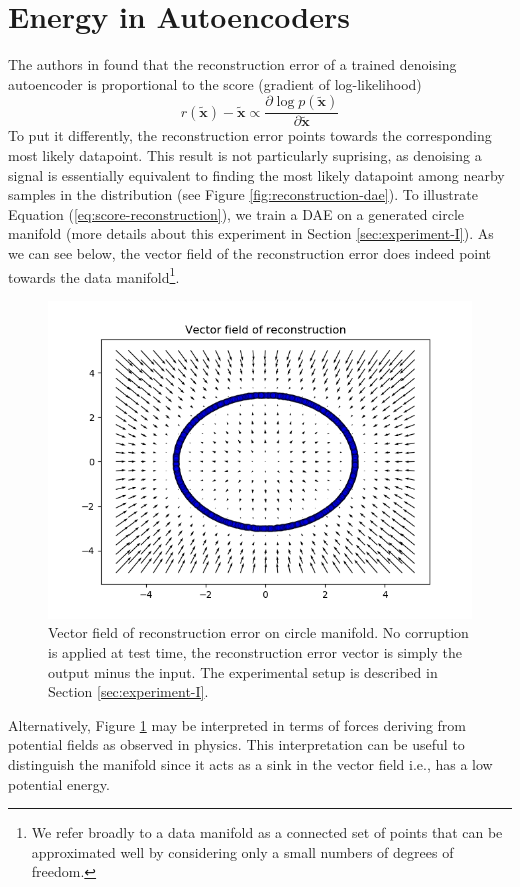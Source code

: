 
\section{Energy in Autoencoders}

The authors in \citep{alainbengio} found that the reconstruction error of a trained denoising autoencoder is proportional to the score (gradient of log-likelihood)
\begin{equation}
r(\tilde{\mathbf{x}}) - \tilde{\mathbf{x}} \propto \frac{\partial \log p(\tilde{\mathbf{x}})}{\partial \tilde{\mathbf{x}}} 
\label{eq:score-reconstruction}
\end{equation} 
To put it differently, the reconstruction error points towards the corresponding most likely datapoint. This result is not particularly suprising, as denoising a signal is essentially equivalent to finding the most likely datapoint among nearby samples in the distribution (see Figure \ref{fig:reconstruction-dae}). To illustrate Equation (\ref{eq:score-reconstruction}), we train a DAE on a generated circle manifold (more details about this experiment in Section \ref{sec:experiment-I}). As we can see below, the vector field of the reconstruction error does indeed point towards the data manifold\footnote{We refer broadly to a data manifold as a connected set of points that can be approximated well by considering only a small numbers of degrees of freedom.}.
\begin{figure}[!h]
\centering
\includegraphics[scale=0.6]{figures/circle-vector-field}
\caption[Vector field circle manifold]{Vector field of reconstruction error on circle manifold. No corruption is applied at test time, the reconstruction error vector is simply the output minus the input. The experimental setup is described in Section \ref{sec:experiment-I}.}
\label{fig:vf-circle}
\end{figure}
Alternatively, Figure \ref{fig:vf-circle} may be interpreted in terms of forces deriving from potential fields as observed in physics. This interpretation can be useful to distinguish the manifold since it acts as a sink in the vector field i.e., has a low potential energy. 

